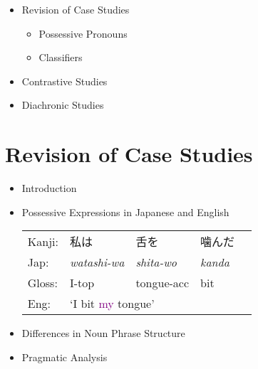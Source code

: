\documentclass[a4paper,landscape,headrule,footrule,dvips]{foils}
\newcommand{\psp}[1]{\textcolor{purple}{#1}}
\begin{document}
\begin{CJK}{UTF8}{min}

\maketitle



\begin{itemize} 
\item Revision of Case Studies
  \begin{itemize} 
  \item Possessive Pronouns
  \item Classifiers
  \end{itemize}
\item Contrastive Studies
\item Diachronic Studies
\end{itemize}



\section{Revision of Case Studies}

\begin{itemize}\addtolength{\itemsep}{-5mm}
\item Introduction

\item Possessive Expressions in Japanese and English
  
 \begin{exe}
   \ex
    \begin{tabular}[t]{lllll}
      Kanji: &  私は &  舌を &  噛んだ\\
      Jap:   &  \sl watashi-wa &  \sl shita-wo & \sl kanda\\
      Gloss: &   I-{\sc top} &  tongue-{\sc acc} &  bit  \\
      Eng:   & \multicolumn{4}{l}{`I bit \psp{my} tongue'}
    \end{tabular}
  \end{exe}
  
\item Differences in Noun Phrase Structure

\item Pragmatic Analysis 


\end{itemize}
\end{CJK}
\end{document}
